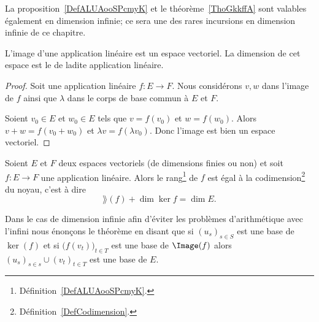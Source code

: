 La proposition~\ref{DefALUAooSPcmyK} et le théorème~\ref{ThoGkkffA} sont valables également en dimension infinie; ce sera une des rares incursions en dimension infinie de ce chapitre.
\begin{propositionDef}\label{DefALUAooSPcmyK}
    L'image d'une application linéaire est un espace vectoriel. La dimension de cet espace est le  de ladite application linéaire.
\end{propositionDef}

\begin{proof}
    Soit une application linéaire \( f\colon E\to F\). Nous considérons \( v,w\) dans l'image de \( f\) ainsi que \( \lambda\) dans le corps de base commun à \( E\) et \( F\).

    Soient \( v_0\in E\) et \( w_0\in E\) tels que \( v=f(v_0)\) et \( w=f(w_0)\). Alors \( v+w=f(v_0+w_0)\) et \( \lambda v=f(\lambda v_0)\). Donc l'image est bien un espace vectoriel.
\end{proof}

\begin{theorem}       \label{ThoGkkffA}
    Soient \( E\) et \( F\) deux espaces vectoriels (de dimensions finies ou non) et soit \( f\colon E\to F\) une application linéaire. Alors le rang\footnote{Définition~\ref{DefALUAooSPcmyK}.} de \( f\) est égal à la codimension\footnote{Définition~\ref{DefCodimension}.} du noyau, c'est à dire
       \begin{equation}
           \rang(f)+\dim\ker f=\dim E.
       \end{equation}

       Dans le cas de dimension infinie afin d'éviter les problèmes d'arithmétique avec l'infini nous énonçons le théorème en disant que si \( (u_s)_{s\in S}\) est une base de \( \ker(f)\) et si \( \big( f(v_t) \big)_{t\in T}\) est une base de \( \Image(f)\) alors  \( (u_s)_{s\in s}\cup (v_t)_{t\in T}\) est une base de \( E\).
\end{theorem}

